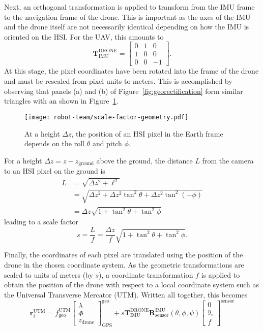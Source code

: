 Next, an orthogonal transformation is applied to transform from the IMU frame to
the navigation frame of the drone. This is important as the axes of the IMU and
the drone itself are not necessarily identical depending on how the IMU is
oriented on the HSI. For the UAV, this amounts to
\begin{equation}
  \mathbf{T}_{\text{IMU}}^{\text{DRONE}} = \begin{bmatrix}
    0 & 1 & 0 \\
    1 & 0 & 0 \\
    0 & 0 & -1
    \end{bmatrix}.
\end{equation}
At this stage, the pixel coordinates have been rotated into the frame of the
drone and must be rescaled from pixel units to meters. This is accomplished by
observing that panels (a) and (b) of Figure~\ref{fig:georectification} form
similar triangles with an shown in Figure~\ref{fig:s-geom}.

\begin{figure}[h]
  \centering
  \texttt{[image: robot-team/scale-factor-geometry.pdf]}
  \caption{At a height $\Delta z$, the position of an HSI pixel in the Earth
    frame depends on the roll $\theta$ and pitch $\phi$.}
  \label{fig:s-geom}
\end{figure}

For a height $\Delta z = z-z_{\text{ground}}$ above the ground, the distance $L$ from
the camera to an HSI pixel on the ground is
\begin{align*}
  L &= \sqrt{\Delta z^2 + \ell^2} \\
    &= \sqrt{\Delta z^2 + \Delta z^2\tan^2\theta + \Delta z^2\tan^2(-\phi)} \\
    &= \Delta z \sqrt{1 + \tan^2\theta + \tan^2\phi}
\end{align*}
leading to a scale factor
\begin{equation}
  s = \frac{L}{f} = \frac{\Delta z}{f}\sqrt{1 + \tan^2\theta + \tan^2\phi}.
\end{equation}

Finally, the coordinates of each pixel are translated using the position of the
drone in the chosen coordinate system. As the geometric transformations are
scaled to units of meters (by $s$), a coordinate transformation $f$ is applied to
obtain the position of the drone with respect to a local coordinate system such
as the Universal Transverse Mercator (UTM). Written all together, this becomes
\begin{equation}\label{eq:georec-eqn}
  \mathbf{r}_{i}^{\text{UTM}} =
  f_{\text{geo}}^{\text{UTM}}\begin{bmatrix}
    \lambda \\
    \Phi \\
    z_{\text{drone}}
  \end{bmatrix}_{\text{GPS}}^{\text{geo}} + s\mathbf{T}_{\text{IMU}}^{\text{DRONE}}\mathbf{R}_{\text{sensor}}^{\text{IMU}}(\theta, \phi, \psi)\begin{bmatrix}
    0 \\
    y_i \\
    f
  \end{bmatrix}^{\text{sensor}}
\end{equation}

